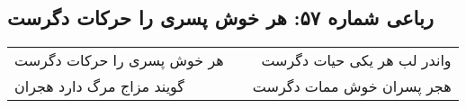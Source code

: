 \begin{center}
\section*{رباعی شماره ۵۷: هر خوش پسری را حرکات دگرست}
\label{sec:sh057}
\begin{longtable}{l p{0.5cm} r}
هر خوش پسری را حرکات دگرست
&&
واندر لب هر یکی حیات دگرست
\\
گویند مزاج مرگ دارد هجران
&&
هجر پسران خوش ممات دگرست
\\
\end{longtable}
\end{center}
